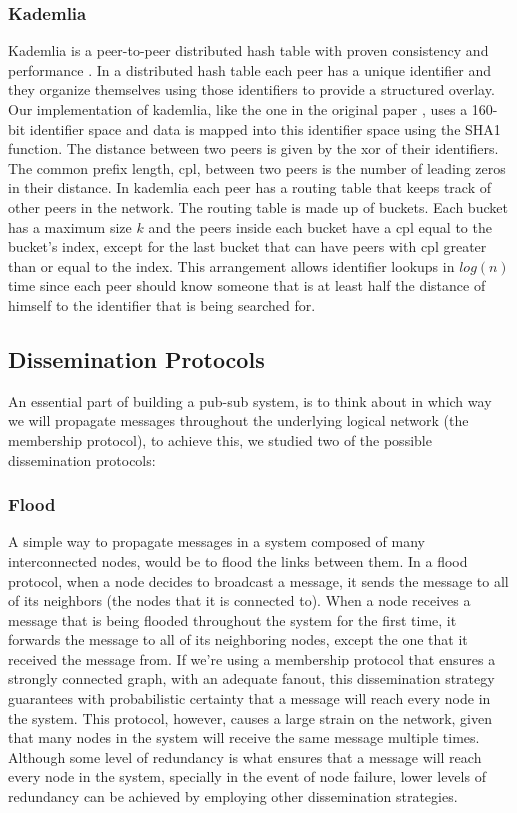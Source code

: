 \documentclass[sigconf]{acmart}
\begin{document}
\subsubsection{Kademlia}
Kademlia is a peer-to-peer distributed hash table with proven consistency and performance \cite{maymounkov2002kademlia}.
In a distributed hash table each peer has a unique identifier and they organize themselves using those identifiers to provide a structured overlay.
Our implementation of kademlia, like the one in the original paper \cite{maymounkov2002kademlia}, uses a 160-bit identifier space and data is mapped into this identifier space using the SHA1 function.
The distance between two peers is given by the xor of their identifiers.
The common prefix length, cpl, between two peers is the number of leading zeros in their distance.
In kademlia each peer has a routing table that keeps track of other peers in the network. The routing table is made up of buckets.
Each bucket has a maximum size $k$ and the peers inside each bucket have a cpl equal to the bucket's index, except for the last bucket that can have peers with cpl greater than or equal to the index.
This arrangement allows identifier lookups in $log(n)$ time since each peer should know someone that is at least half the distance of himself to the identifier that is being searched for.

\subsection{Dissemination Protocols}

An essential part of building a pub-sub system, is to think about in which way we will propagate messages throughout the underlying logical network (the membership protocol), to achieve this, we studied two of the possible dissemination protocols:

\subsubsection{Flood} 

A simple way to propagate messages in a system composed of many interconnected nodes, would be to flood the links between them. In a flood protocol, when a node decides to broadcast a message, it sends the message to all of its neighbors (the nodes that it is connected to). When a node receives a message that is being flooded throughout the system for the first time, it forwards the message to all of its neighboring nodes, except the one that it received the message from.
If we’re using a membership protocol that ensures a strongly connected graph, with an adequate fanout, this dissemination strategy guarantees with probabilistic certainty that a message will reach every node in the system. 
This protocol, however, causes a large strain on the network, given that many nodes in the system will receive the same message multiple times. Although some level of redundancy is what ensures that a message will reach every node in the system, specially in the event of node failure, lower levels of redundancy can be achieved by employing other dissemination strategies.
\end{document}
